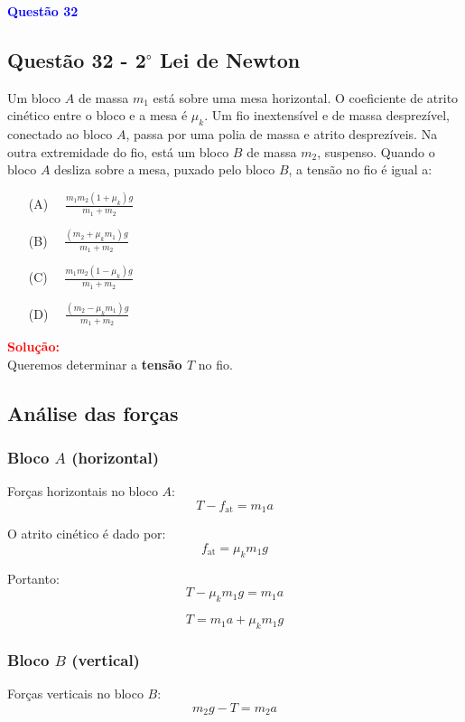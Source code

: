 \begin{flushleft}
\textbf{\textcolor{blue}{\Large Quest\~ao 32}}\\
\noindent
\subsection{Quest\~ao 32 - 2$^{\circ}$ Lei de Newton}
Um bloco \(A\) de massa \(m_1\) está sobre uma mesa horizontal.  
O coeficiente de atrito cinético entre o bloco e a mesa é \(\mu_k\).  
Um fio inextensível e de massa desprezível, conectado ao bloco \(A\), passa por uma polia de massa e atrito desprezíveis.  
Na outra extremidade do fio, está um bloco \(B\) de massa \(m_2\), suspenso.  
Quando o bloco \(A\) desliza sobre a mesa, puxado pelo bloco \(B\), a tensão no fio é igual a:


\begin{itemize}
\item[(A)] $\quad \frac{m_1 m_2 (1 + \mu_k) g}{m_1 + m_2}
\qquad$
\item[(B)] $\quad \frac{(m_2 + \mu_k m_1) g}{m_1 + m_2}\qquad$
\item[(C)] $\quad \frac{m_1 m_2 (1 - \mu_k) g}{m_1 + m_2}
\qquad$
\item[(D)] $\quad \frac{(m_2 - \mu_k m_1) g}{m_1 + m_2}$
\end{itemize}

\vspace{0.5cm}


\textcolor{red}{\textbf{Solução:}}\\

Queremos determinar a \textbf{tensão \( T \)} no fio.

\subsection*{Análise das forças}

\subsubsection*{Bloco \( A \) (horizontal)}
Forças horizontais no bloco \( A \):
\[
T - f_{\text{at}} = m_1 a
\]

O atrito cinético é dado por:
\[
f_{\text{at}} = \mu_k m_1 g
\]

Portanto:
\[
T - \mu_k m_1 g = m_1 a
\]

\[
T = m_1 a + \mu_k m_1 g
\]

\subsubsection*{Bloco \( B \) (vertical)}
Forças verticais no bloco \( B \):
\[
m_2 g - T = m_2 a
\]


\end{flushleft}
